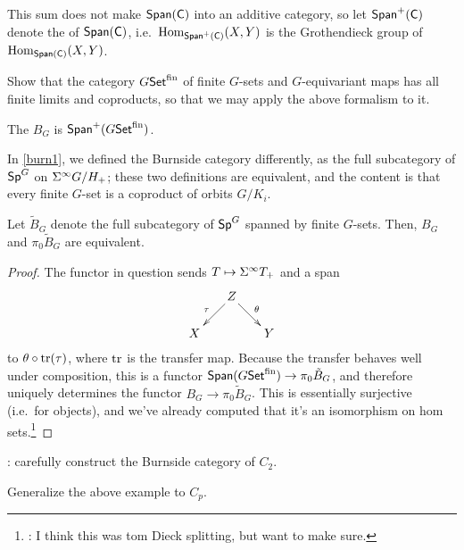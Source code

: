 This sum does not make $\mathsf{Span}(\mathsf C)$ into an additive category, so let $\mathsf{Span}^+(\mathsf C)$ denote the
 of $\mathsf{Span}(\mathsf C)$, i.e.\ $\operatorname{Hom}_{\mathsf{Span}^+(\mathsf C)}(X,Y)$ is the Grothendieck group of
$\operatorname{Hom}_{\mathsf{Span}(\mathsf C)}(X,Y)$.
\begin{ex}
Show that the category $G\mathsf{Set}^{\mathrm{fin}}$ of finite $G$-sets and $G$-equivariant maps has all finite limits and
coproducts, so that we may apply the above formalism to it.
\end{ex}
\begin{defn}
\label{burn2}
The  $B_G$ is $\mathsf{Span}^+(G\mathsf{Set}^{\mathrm{fin}})$.
\end{defn}
In \cref{burn1}, we defined the Burnside category differently, as the full subcategory of $\mathsf{Sp}^G$ on $\Sigma^\infty G/H_+$;
these two definitions are equivalent, and the content is that every finite $G$-set is a coproduct of orbits
$G/K_i$.
\begin{prop}
Let $\tilde B_G$ denote the full subcategory of $\mathsf{Sp}^G$ spanned by finite $G$-sets. Then, $B_G$ and $\pi_0\tilde
B_G$ are equivalent.
\end{prop}
\begin{proof}
The functor in question sends $T\mapsto\sus T_+$ and a span
\[\xymatrix@dr{
	Z\ar[r]^\theta\ar[d]_\tau & Y\\
	X
}\]
to $\theta\circ\operatorname{tr}(\tau)$, where $\operatorname{tr}$ is the transfer map. Because the transfer behaves well under composition,
this is a functor $\mathsf{Span}(G\mathsf{Set}^{\mathrm{fin}})\to\pi_0\tilde B_G$, and therefore uniquely determines the functor
$B_G\to\pi_0\tilde B_G$. This is essentially surjective (i.e.\ for objects), and we've already computed that it's
an isomorphism on hom sets.\footnote{\TODO: I think this was tom Dieck splitting, but want to make sure.}
\end{proof}
\begin{exm}
\TODO: carefully construct the Burnside category of $C_2$.
\end{exm}
\begin{ex}
Generalize the above example to $C_p$.
\end{ex}
